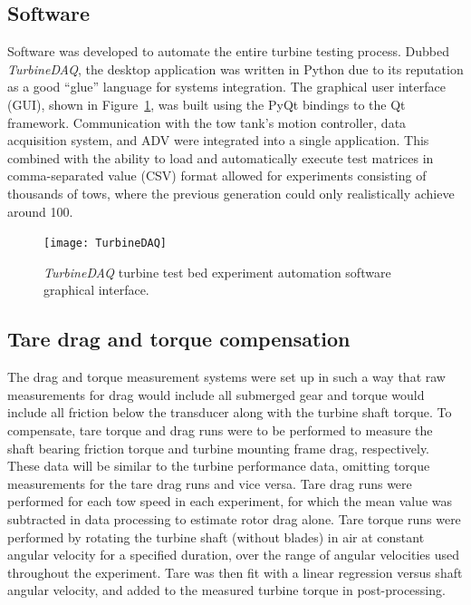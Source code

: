 \subsection{Software}

Software was developed to automate the entire turbine testing process. Dubbed
\textit{TurbineDAQ}, the desktop application was written in Python due to its
reputation as a good ``glue'' language for systems integration. The graphical
user interface (GUI), shown in Figure~\ref{fig:TurbineDAQ}, was built using the
PyQt bindings to the Qt framework. Communication with the tow tank's motion
controller, data acquisition system, and ADV were integrated into a single
application. This combined with the ability to load and automatically execute
test matrices in comma-separated value (CSV) format allowed for experiments
consisting of thousands of tows, where the previous generation could only
realistically achieve around 100.

\begin{figure}[ht]
    \centering
    
    \texttt{[image: TurbineDAQ]}
    
    \caption{\textit{TurbineDAQ} turbine test bed experiment automation software
        graphical interface.}
    
    \label{fig:TurbineDAQ}
\end{figure}


\subsection{Tare drag and torque compensation} 

The drag and torque measurement systems were set up in such a way that raw
measurements for drag would include all submerged gear and torque would include
all friction below the transducer along with the turbine shaft torque. To
compensate, tare torque and drag runs were to be performed to measure the shaft
bearing friction torque and turbine mounting frame drag, respectively. These
data will be similar to the turbine performance data, omitting torque
measurements for the tare drag runs and vice versa. Tare drag runs were
performed for each tow speed in each experiment, for which the mean value was
subtracted in data processing to estimate rotor drag alone. Tare torque runs
were performed by rotating the turbine shaft (without blades) in air at constant
angular velocity for a specified duration, over the range of angular velocities
used throughout the experiment. Tare was then fit with a linear regression
versus shaft angular velocity, and added to the measured turbine torque in
post-processing.


